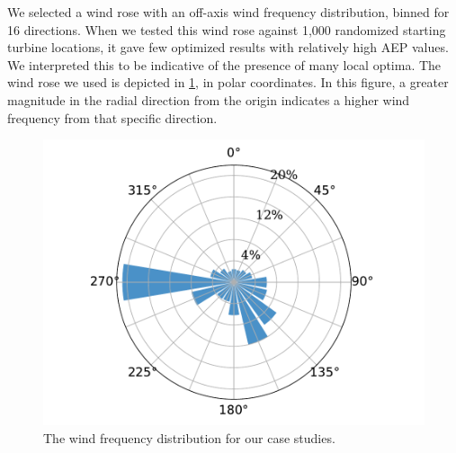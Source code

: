 	We selected a wind rose with an off-axis wind frequency distribution, binned for 16 directions.
	When we tested this wind rose against 1,000 randomized starting turbine locations, it gave few optimized results with relatively high AEP values.
	We interpreted this to be indicative of the presence of many local optima.
    The wind rose we used is depicted in \cref{fig:freqdist}, in polar coordinates. In this figure, a greater magnitude in the radial direction from the origin indicates a higher wind frequency from that specific direction.
	
	\begin{figure}[H]
		\centering \includegraphics[width=.5\textwidth]{./figures/windrose.pdf}
		\caption{The wind frequency distribution for our case studies.}
		\label{fig:freqdist}
	\end{figure}




